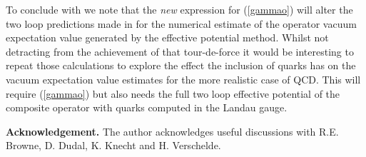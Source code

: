 \documentclass[a4paper,11pt]{article}
\begin{document}
To conclude with we note that the {\em new} expression for (\ref{gammao}) will
alter the two loop predictions made in \cite{2} for the numerical estimate of
the operator vacuum expectation value generated by the effective potential 
method. Whilst not detracting from the achievement of that tour-de-force it 
would be interesting to repeat those calculations to explore the effect the 
inclusion of quarks has on the vacuum expectation value estimates for the more
realistic case of QCD. This will require (\ref{gammao}) but also needs the full
two loop effective potential of the composite operator with quarks computed in 
the Landau gauge.  

\noindent
{\bf Acknowledgement.} The author acknowledges useful discussions with R.E.
Browne, D. Dudal, K. Knecht and H. Verschelde.  

\end{document}
